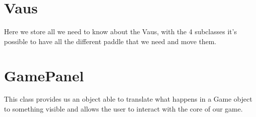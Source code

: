 \section*{Vaus}
\label{sec:vaus}
Here we store all we need to know about the Vaus, with the 4 subclasses it's possible to have all the different paddle that we need and move them.

\section*{GamePanel}
\label{sec:gamepanel}
This class provides us an object able to translate what happens in a Game object to something visible and allows the user to interact with the core of our game.